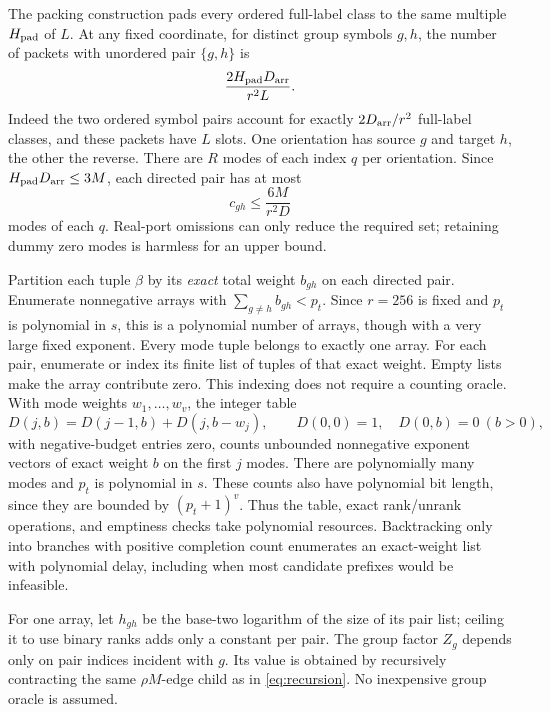 \documentclass[11pt,letterpaper]{article}
\theoremstyle{definition}\newtheorem{definition}[theorem]{Definition}
\theoremstyle{remark}\newtheorem{remark}[theorem]{Remark}
\begin{document}
The packing construction pads every ordered full-label class to the same
multiple $H_{\rm pad}$ of $L$. At any fixed coordinate, for distinct group
symbols $g,h$, the number of packets with unordered pair $\{g,h\}$ is
\[
 \frac{2H_{\rm pad}D_{\rm arr}}{r^2L}.
\]
Indeed the two ordered symbol pairs account for exactly
$2D_{\rm arr}/r^2$ full-label classes, and these packets have $L$ slots.
One orientation has source $g$ and target $h$, the other the reverse.
There are $R$ modes of each index $q$ per orientation. Since
$H_{\rm pad}D_{\rm arr}\le3M$, each directed pair has at most
\begin{equation}\label{eq:paircolors}
 c_{gh}\le\frac{6M}{r^2D}
\end{equation}
modes of each $q$. Real-port omissions can only reduce the required set;
retaining dummy zero modes is harmless for an upper bound.

Partition each tuple $\beta$ by its \emph{exact} total weight $b_{gh}$ on
each directed pair. Enumerate nonnegative arrays with
$\sum_{g\ne h}b_{gh}<p_t$. Since $r=256$ is fixed and $p_t$ is polynomial
in $s$, this is a polynomial number of arrays, though with a very large
fixed exponent. Every mode tuple belongs to exactly one array.
For each pair, enumerate or index its finite list of tuples of that exact
weight. Empty lists make the array contribute zero. This indexing does not
require a counting oracle. With mode weights $w_1,\ldots,w_v$, the integer
table
\[
 D(j,b)=D(j-1,b)+D(j,b-w_j),\qquad
 D(0,0)=1,\quad D(0,b)=0\ (b>0),
\]
with negative-budget entries zero, counts unbounded nonnegative exponent
vectors of exact weight $b$ on the first $j$ modes. There are polynomially
many modes and $p_t$ is polynomial in $s$. These counts also have polynomial
bit length, since they are bounded by $(p_t+1)^v$. Thus the table, exact
rank/unrank operations, and emptiness checks take polynomial resources.
Backtracking only into branches with positive completion count enumerates
an exact-weight list with polynomial delay, including when most candidate
prefixes would be infeasible.

For one array, let $h_{gh}$ be the base-two logarithm of the size of its
pair list; ceiling it to use binary ranks adds only a constant per pair.
The group factor $Z_g$ depends only on pair indices incident with $g$.
Its value is obtained by recursively contracting the same $\rho M$-edge
child as in \eqref{eq:recursion}. No inexpensive group oracle is assumed.
\end{document}
